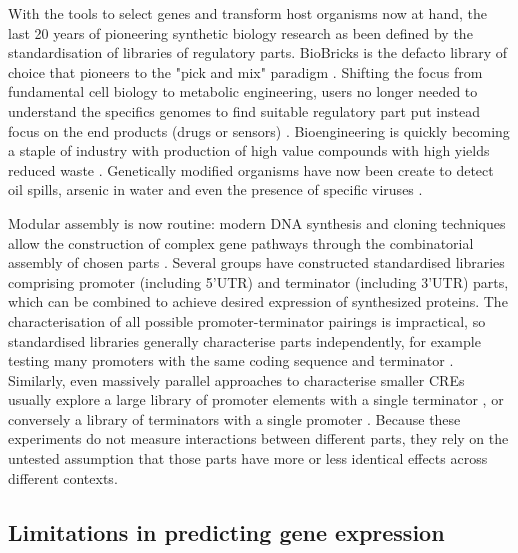 \documentclass{SBCbookchapter}
\begin{document}
With the tools to select genes and transform host organisms now at hand, the last 20 years of pioneering synthetic biology research as been defined by the standardisation of libraries of regulatory parts. 
BioBricks is the defacto library of choice that pioneers to the "pick and mix" paradigm \cite{Knight2003}.
Shifting the focus from fundamental cell biology to metabolic engineering, users no longer needed to understand the specifics genomes to find suitable regulatory part put instead focus on the end products (drugs or sensors) . 
Bioengineering is quickly becoming a staple of industry with production of high value compounds with high yields reduced waste \cite{Krivoruchko2015}.
Genetically modified organisms have now been create to detect oil spills, arsenic in water and even the presence of specific viruses \cite{Wan2019,Willardson1998,Tancharoen2019}.

Modular assembly is now routine: modern DNA synthesis and cloning techniques allow the construction of complex gene pathways through the combinatorial assembly of chosen parts \cite{Curran2013,Lee2015,Garcia2018,Andreou2018}.
Several groups have constructed standardised libraries comprising promoter (including 5’UTR) and terminator (including 3’UTR) parts, which can be combined to achieve desired expression of synthesized proteins.
The characterisation of all possible promoter-terminator pairings is impractical, so standardised libraries generally characterise parts independently, for example testing many promoters with the same coding sequence and terminator \cite{Lee2015}.
Similarly, even massively parallel approaches to characterise smaller CREs usually explore a large library of promoter elements with a single terminator \cite{Sharon2012}, or conversely a library of terminators with a single promoter \cite{Shalem2015}. 
Because these experiments do not measure interactions between different parts, they rely on the untested assumption that those parts have more or less identical effects across different contexts.

\subsection{Limitations in predicting gene expression}
\end{document}
